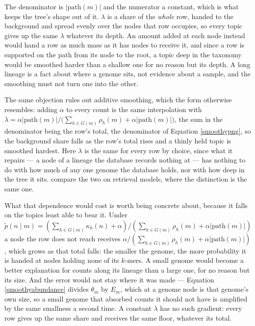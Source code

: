 \documentclass[pdflatex,sn-vancouver-num]{sn-jnl}
\begin{document}
    The denominator is $\lvert \mathrm{path}(m) \rvert$ and the numerator a constant, which is what
    keeps the tree's shape out of it. $\lambda$ is a share of the \emph{whole} row, handed to the
    background and spread evenly over the nodes that row occupies, so every topic gives up the same
    $\lambda$ whatever its depth. An amount added at each node instead would hand a row as much mass
    as it has nodes to receive it, and since a row is supported on the path from its node to the
    root, a topic deep in the taxonomy would be smoothed harder than a shallow one for no reason but
    its depth. A long lineage is a fact about where a genome sits, not evidence about a sample, and
    the smoothing must not turn one into the other.

    The same objection rules out additive smoothing, which the form otherwise resembles: adding
    $\alpha$ to every count is the same interpolation with
    $\lambda = \alpha \lvert \mathrm{path}(m) \rvert / \bigl( \sum_{h \in G(m)} \rho_h(m) + \alpha \lvert \mathrm{path}(m) \rvert \bigr)$,
    the sum in the denominator being the row's total, the denominator of Equation \eqref{smoothypng},
    so the background share falls as the row's total rises and a thinly held topic is smoothed
    hardest. Here $\lambda$ is the same for every row by choice, since what it repairs --- a node of
    a lineage the database records nothing at --- has nothing to do with how much of any one genome
    the database holds, nor with how deep in the tree it sits. \citet{zhailafferty} compare the two
    on retrieval models, where the distinction is the same one.

    What that dependence would cost is worth being concrete about, because it falls on the topics
    least able to bear it. Under $\tilde{p}(n \mid m) = (\sum_{h \in G(m)} \kappa_h(n) + \alpha) / (\sum_{h \in G(m)} \rho_h(m) + \alpha \lvert
    \mathrm{path}(m) \rvert)$ a node the row does not reach receives $\alpha / (\sum_{h \in G(m)} \rho_h(m) + \alpha \lvert
    \mathrm{path}(m) \rvert)$, which grows as that total falls: the smaller the genome, the more
    probability it is handed at nodes holding none of its $k$-mers. A small genome would become a
    better explanation for counts along its lineage than a large one, for no reason but its size. And
    the error would not stay where it was made --- Equation \eqref{smoothyabundance} divides
    $\theta_m$ by $E_m$, which at a genome node is that genome's own size, so a small genome that absorbed counts it should not have is amplified by
    the same smallness a second time. A constant $\lambda$ has no such gradient: every row gives up
    the same share and receives the same floor, whatever its total.
\end{document}
